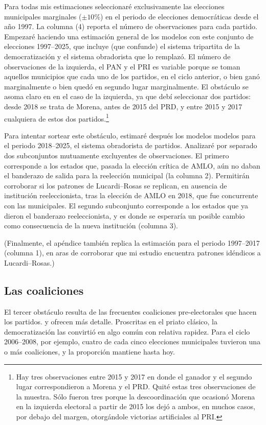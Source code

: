 \documentclass[letter,12pt]{article}
\begin{document}
Para todas mis estimaciones seleccionaré exclusivamente las elecciones municipales marginales ($\pm10\%$) en el periodo de elecciones democráticas desde el año 1997. La columna (4) reporta el número de observaciones para cada partido. Empezaré haciendo una estimación general de los modelos con este conjunto de elecciones 1997--2025, que incluye (que confunde) el sistema tripartita de la democratización y el sistema obradorista que lo remplazó. El número de observaciones de la izquierda, el PAN y el PRI es variable porque se toman aquellos municipios que cada uno de los partidos, en el ciclo anterior, o bien ganó marginalmente o bien quedó en segundo lugar marginalmente. El obstáculo se asoma claro en en el caso de la izquierda, ya que debí seleccionar dos partidos: desde 2018 se trata de Morena, antes de 2015 del PRD, y entre 2015 y 2017 cualquiera de estos dos partidos.\footnote{Hay tres observaciones entre 2015 y 2017 en donde el ganador y el segundo lugar correspondieron a Morena y el PRD. Quité estas tres observaciones de la muestra. Sólo fueron tres porque la descoordinación que ocasionó Morena en la izquierda electoral a partir de 2015 los dejó a ambos, en muchos casos, por debajo del margen, otorgándole victorias artificiales al PRI.}

Para intentar sortear este obstáculo, estimaré después los modelos modelos para el periodo 2018--2025, el sistema obradorista de partidos. Analizaré por separado dos subconjuntos mutuamente excluyentes de observaciones. El primero corresponde a los estados que, pasada la elección crítica de AMLO, aún no daban el banderazo de salida para la reelección municipal (la columna 2). Permitirán corroborar si los patrones de Lucardi--Rosas se replican, en ausencia de institución reeleccionista, tras la elección de AMLO en 2018, que fue concurrente con las municipales. El segundo subconjunto corresponde a los estados que ya dieron el banderazo reeleccionista, y es donde se esperaría un posible cambio como consecuencia de la nueva institución (columna 3).

(Finalmente, el apéndice también replica la estimación para el periodo 1997--2017 (columna 1), en aras de corroborar que mi estudio encuentra patrones idéndicos a Lucardi--Rosas.)

\subsection{Las coaliciones}

\noindent El tercer obstáculo resulta de las frecuentes coaliciones pre-electorales que hacen los partidos. \citet{magar.el.dataset.2026} y \citet{spoon.pulido.PRI-PVEM2017} ofrecen más detalle. Proscritas en el priato clásico, la democratización las convirtió en algo común con relativa rapidez. Para el ciclo 2006--2008, por ejemplo, cuatro de cada cinco elecciones municipales tuvieron una o más coaliciones, y la proporción mantiene hasta hoy.
\end{document}
